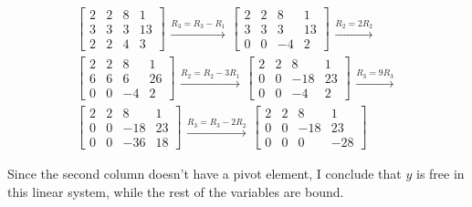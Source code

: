 \documentclass[11pt]{article}
\begin{document}
\begin{align*}
  \begin{bmatrix}
    2 & 2 & 8 & 1 \\
    3 & 3 & 3 & 13 \\
    2 & 2 & 4 & 3
  \end{bmatrix}
  \begin{aligned} \xrightarrow{R_3 = R_3 - R_1} \end{aligned}
  \begin{bmatrix}
    2 & 2 & 8 & 1 \\
    3 & 3 & 3 & 13 \\
    0 & 0 & -4 & 2
  \end{bmatrix}
  \begin{aligned} \xrightarrow{R_2 = 2R_2} \end{aligned} \\
  \begin{bmatrix}
    2 & 2 & 8 & 1 \\
    6 & 6 & 6 & 26 \\
    0 & 0 & -4 & 2
  \end{bmatrix}
  \begin{aligned} \xrightarrow{R_2 = R_2 - 3R_1} \end{aligned}
  \begin{bmatrix}
    2 & 2 & 8   & 1 \\
    0 & 0 & -18 & 23 \\
    0 & 0 & -4  & 2
  \end{bmatrix}
  \begin{aligned} \xrightarrow{R_3 = 9R_3} \end{aligned} \\
  \begin{bmatrix}
    2 & 2 & 8   & 1 \\
    0 & 0 & -18 & 23 \\
    0 & 0 & -36  & 18
  \end{bmatrix}
  \begin{aligned} \xrightarrow{R_3 = R_3 - 2R_2} \end{aligned}
  \begin{bmatrix}
    2 & 2 & 8   & 1 \\
    0 & 0 & -18 & 23 \\
    0 & 0 & 0   & -28
  \end{bmatrix}
\end{align*}

Since the second column doesn't have a pivot element, I conclude that \(y\) is
free in this linear system, while the rest of the variables are bound.
\end{document}
